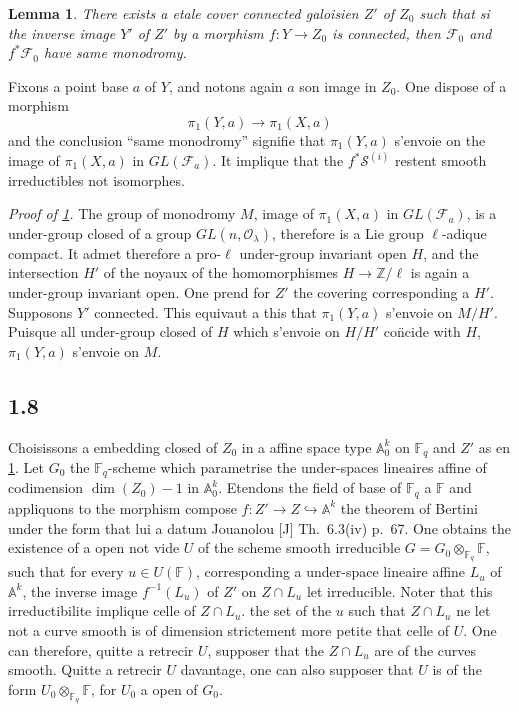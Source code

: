 \documentclass[11pt,a4paper]{article}
\theoremstyle{plain}
\newtheorem{lemma}[theorem]{Lemma}
\theoremstyle{definition}
\begin{document}
\begin{lemma}\label{lem:1.7}
There exists a etale cover connected galoisien $Z'$ of $Z_0$ such that si the inverse image $Y'$ of $Z'$ by a morphism $f: Y \to Z_0$ is connected, then $\mathcal{F}_0$ and $f^* \mathcal{F}_0$ have same monodromy.
\end{lemma}

Fixons a point base $a$ of $Y$, and notons again $a$ son image in $Z_0$. One dispose of a morphism
\[
\pi_1(Y,a) \to \pi_1(X,a)
\]
and the conclusion ``same monodromy'' signifie that $\pi_1(Y,a)$ s'envoie on the image of $\pi_1(X,a)$ in $GL(\mathcal{F}_a)$. It implique that the $f^* \mathcal{S}^{(i)}$ restent smooth irreductibles not isomorphes.

\noindent\textit{Proof of \ref{lem:1.7}.} The group of monodromy $M$, image of $\pi_1(X,a)$ in $GL(\mathcal{F}_a)$, is a under-group closed of a group $GL(n, \mathcal{O}_\lambda)$, therefore is a Lie group $\ell$-adique compact. It admet therefore a pro-$\ell$ under-group invariant open $H$, and the intersection $H'$ of the noyaux of the homomorphismes $H \to \mathbb{Z}/\ell$ is again a under-group invariant open. One prend for $Z'$ the covering corresponding a $H'$. Supposons $Y'$ connected. This equivaut a this that $\pi_1(Y,a)$ s'envoie on $M/H'$. Puisque all under-group closed of $H$ which s'envoie on $H/H'$ co\"ncide with $H$, $\pi_1(Y,a)$ s'envoie on $M$.

\subsection{1.8}

Choisissons a embedding closed of $Z_0$ in a affine space type $\mathbb{A}_0^{k}$ on $\mathbb{F}_q$ and $Z'$ as en \ref{lem:1.7}. Let $G_0$ the $\mathbb{F}_q$-scheme which parametrise the under-spaces lineaires affine of codimension $\dim(Z_0)-1$ in $\mathbb{A}_0^{k}$. Etendons the field of base of $\mathbb{F}_q$ a $\mathbb{F}$ and appliquons to the morphism compose $f: Z' \to Z \hookrightarrow \mathbb{A}^{k}$ the theorem of Bertini under the form that lui a datum Jouanolou [J] Th.~6.3(iv) p.~67. One obtains the existence of a open not vide $U$ of the scheme smooth irreducible $G = G_0 \otimes_{\mathbb{F}_q} \mathbb{F}$, such that for every $u \in U(\mathbb{F})$, corresponding a under-space lineaire affine $L_u$ of $\mathbb{A}^{k}$, the inverse image $f^{-1}(L_u)$ of $Z'$ on $Z \cap L_u$ let irreducible. Noter that this irreductibilite implique celle of $Z \cap L_u$. the set of the $u$ such that $Z \cap L_u$ ne let not a curve smooth is of dimension strictement more petite that celle of $U$. One can therefore, quitte a retrecir $U$, supposer that the $Z \cap L_u$ are of the curves smooth. Quitte a retrecir $U$ davantage, one can also supposer that $U$ is of the form $U_0 \otimes_{\mathbb{F}_q} \mathbb{F}$, for $U_0$ a open of $G_0$.
\end{document}
